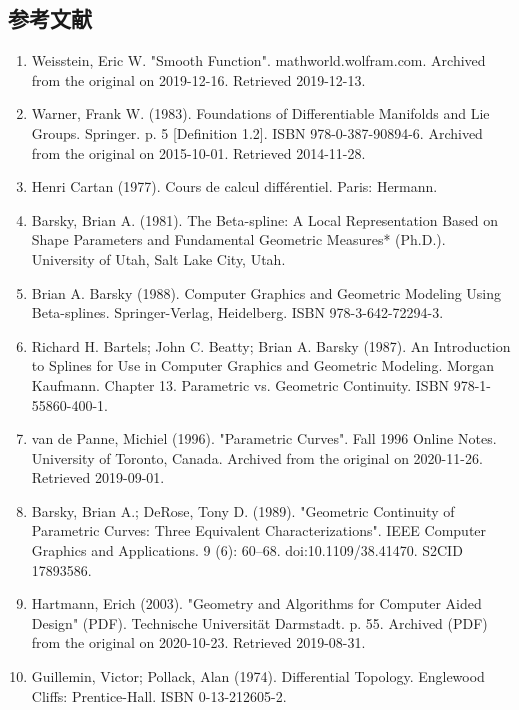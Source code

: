 \subsection{参考文献}

\begin{enumerate}
\item Weisstein, Eric W. "Smooth Function". mathworld.wolfram.com. Archived from the original on 2019-12-16. Retrieved 2019-12-13.
\item Warner, Frank W. (1983). Foundations of Differentiable Manifolds and Lie Groups. Springer. p. 5 [Definition 1.2]. ISBN 978-0-387-90894-6. Archived from the original on 2015-10-01. Retrieved 2014-11-28.
\item Henri Cartan (1977). Cours de calcul différentiel. Paris: Hermann.
\item Barsky, Brian A. (1981). The Beta-spline: A Local Representation Based on Shape Parameters and Fundamental Geometric Measures* (Ph.D.). University of Utah, Salt Lake City, Utah.
\item Brian A. Barsky (1988). Computer Graphics and Geometric Modeling Using Beta-splines. Springer-Verlag, Heidelberg. ISBN 978-3-642-72294-3.
\item Richard H. Bartels; John C. Beatty; Brian A. Barsky (1987). An Introduction to Splines for Use in Computer Graphics and Geometric Modeling. Morgan Kaufmann. Chapter 13. Parametric vs. Geometric Continuity. ISBN 978-1-55860-400-1.
\item van de Panne, Michiel (1996). "Parametric Curves". Fall 1996 Online Notes. University of Toronto, Canada. Archived from the original on 2020-11-26. Retrieved 2019-09-01.
\item Barsky, Brian A.; DeRose, Tony D. (1989). "Geometric Continuity of Parametric Curves: Three Equivalent Characterizations". IEEE Computer Graphics and Applications. 9 (6): 60–68. doi:10.1109/38.41470. S2CID 17893586.
\item Hartmann, Erich (2003). "Geometry and Algorithms for Computer Aided Design" (PDF). Technische Universität Darmstadt. p. 55. Archived (PDF) from the original on 2020-10-23. Retrieved 2019-08-31.
\item Guillemin, Victor; Pollack, Alan (1974). Differential Topology. Englewood Cliffs: Prentice-Hall. ISBN 0-13-212605-2.
\end{enumerate}
